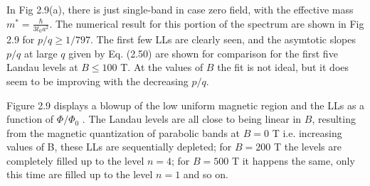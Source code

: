 \documentclass{report}
\begin{document}
In Fig 2.9(a), there is just single-band in case zero field, with the effective mass $m^{*} = \frac{\hbar}{3 t_{0} a^{2}}$. The numerical result for this portion of the spectrum are shown in Fig 2.9 for $p/q \geq 1/797$. The first few LLs are clearly seen, and the asymtotic slopes $p/q$ at large $q$ given by Eq. (2.50) are shown for comparison for the first five Landau levels at $B \leq 100$ T. At the values of $B$ the fit is not ideal, but it does seem to be improving with the decreasing $p/q$.

Figure 2.9 displays a blowup of the low uniform magnetic region and the \ac{LLs} as a function of $\Phi / \Phi_{0}$ \cite{Li_2011}. The Landau levels are all close to being linear in $B$, resulting from the magnetic quantization of parabolic bands at $B = 0$ T i.e. increasing values of B, these \ac{LLs} are sequentially depleted; for $B=200$ T the levels are completely filled up to the level $n=4$; for $B = 500$ T it happens the same, only this time are filled up to the level $n=1$ and so on.

%
%
\end{document}

